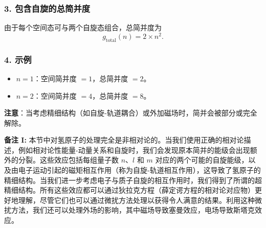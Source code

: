 \subsubsection*{3. 包含自旋的总简并度}
由于每个空间态可与两个自旋态组合，总简并度为
\[
g_{\text{total}}(n) = 2 \times n^2.
\]

\subsubsection*{4. 示例}
\begin{itemize}
	\item \( n = 1 \)：空间简并度 \( = 1 \)，总简并度 \( = 2 \)。
	\item \( n = 2 \)：空间简并度 \( = 4 \)，总简并度 \( = 8 \)。
\end{itemize}

\noindent
\textbf{注意}：当考虑精细结构（如自旋-轨道耦合）或外加磁场时，简并会被部分或完全解除。

\noindent \textbf{备注 I:} 本节中对氢原子的处理完全是非相对论的。当我们使用正确的相对论描述，例如相对论性能量-动量关系和自旋时，我们会发现原本简并的能级会出现额外的分裂。这些效应包括每组量子数 $n$、$l$ 和 $m$ 对应的两个可能的自旋能级，以及由电子运动引起的磁矩相互作用（称为自旋-轨道相互作用），这导致了氢原子的精细结构。当我们进一步考虑电子与质子自旋的相互作用时，我们得到了所谓的超精细结构。所有这些效应都可以通过狄拉克方程（薛定谔方程的相对论对应物）更好地理解，尽管它们也可以通过微扰方法处理以获得令人满意的结果。利用这种微扰方法，我们还可以处理外场的影响，其中磁场导致塞曼效应，电场导致斯塔克效应。
